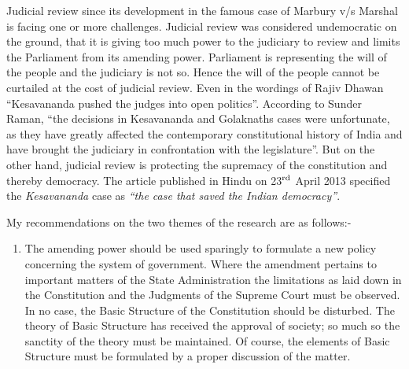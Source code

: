 \begin{multicols}{2}
\noi
{}

\noi
Judicial review since its development in the famous case of Marbury v/s Marshal is
facing one or more challenges. Judicial review was considered undemocratic on the
ground, that it is giving too much power to the judiciary to review and limits the
Parliament from its amending power. Parliament is representing the will of the people
and the judiciary is not so. Hence the will of the people cannot be curtailed at the cost
of judicial review. Even in the wordings of Rajiv Dhawan “Kesavananda pushed the
judges into open politics”. According to Sunder Raman, “the decisions in Kesavananda
and Golaknaths cases were unfortunate, as they have greatly affected the contemporary
constitutional history of India and have brought the judiciary in confrontation with the
legislature”. But on the other hand, judicial review is protecting the supremacy of the
constitution and thereby democracy. The article published in Hindu on 23$^{\rm rd}$ April 2013
specified the \textit{Kesavananda} case as \textit{“the case that saved the Indian democracy”}.

\noi
{}

\noi
My recommendations on the two themes of the research are as follows:-

\begin{enumerate}

\item The amending power should be used sparingly to formulate a new policy
concerning the system of government. Where the amendment pertains to important
matters of the State Administration the limitations as laid down in the Constitution
and the Judgments of the Supreme Court must be observed. In no case, the Basic
Structure of the Constitution should be disturbed. The theory of Basic Structure has
received the approval of society; so much so the sanctity of the theory must be
maintained. Of course, the elements of Basic Structure must be formulated by a
proper discussion of the matter.



\end{enumerate}
\end{multicols}
